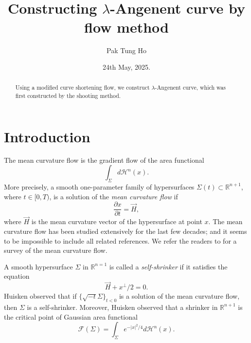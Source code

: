 \documentclass{amsart}
\theoremstyle{Corollary}
\numberwithin{equation}{section}
\begin{document}
\title{Constructing $\lambda$-Angenent curve
by flow method}

\author{Pak Tung Ho}
\address{Department of Mathematics, Tamkang University Tamsui, New Taipei City 251301, Taiwan}









\date{24th May, 2025.}


\begin{abstract}

Using a modified curve shortening flow,
we construct $\lambda$-Angenent curve, 
which was first constructed 
by the shooting method. 
\end{abstract}

\maketitle


\section{Introduction}


The mean curvature flow is the gradient flow of the area functional
$$\int_\Sigma d\mathcal{H}^n(x).$$ 
More precisely, a smooth 
one-parameter family of hypersurfaces $\Sigma(t)\subset\mathbb{R}^{n+1}$, 
where $t\in [0,T)$, is a solution of the \textit{mean curvature flow}
if 
$$\frac{\partial x}{\partial t}
=\vec{H},$$
where $\vec{H}$ is the mean curvature vector of 
the hypersurface at point $x$. 
The mean curvature flow 
has been studied extensively for the last few decades; 
and it seems to be impossible to include all related references. 
We refer 
the readers to 
\cite{Colding}
for a survey of the mean curvature flow. 

A smooth hypersurface $\Sigma$ in $\mathbb{R}^{n=1}$ is called a
\textit{self-shrinker} if
it satisfies the equation 
$$\vec{H}+x^{\perp}/2=0.$$ 
Huisken
\cite{Huisken}
observed that if $\{\sqrt{-t}\Sigma\}_{t<0}$ 
is a solution of the mean curvature flow, 
then $\Sigma$ is a self-shrinker. 
Moreover, Huisken observed that a shrinker in $\mathbb{R}^{n+1}$
is the critical point of Gaussian area functional $$\mathcal{F}(\Sigma)=\int_\Sigma e^{-|x|^2/4}d\mathcal{H}^n(x).$$
\end{document}
